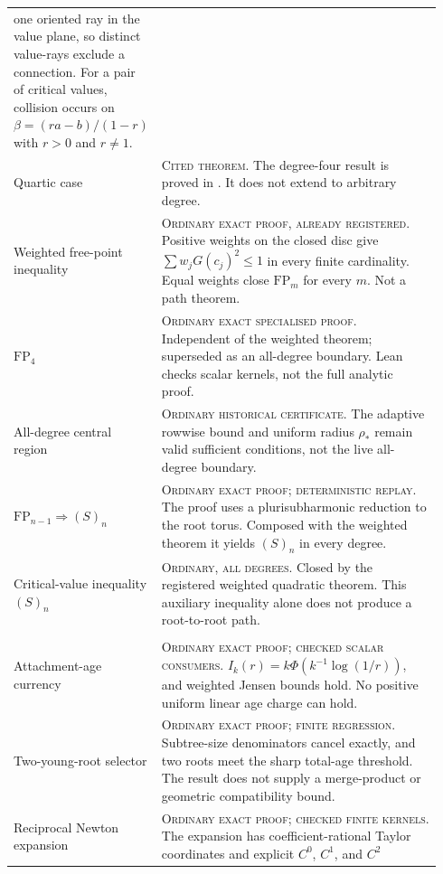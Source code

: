 {\begin{longtable}{@{}
  >{\raggedright\arraybackslash}p{0.28\linewidth}
  >{\raggedright\arraybackslash}p{0.66\linewidth}@{}}
one oriented ray in the value plane, so distinct value-rays exclude a connection.  For a pair of
critical values, collision occurs on
$\beta=(ra-b)/(1-r)$ with $r>0$ and $r\ne1$. \\
\addlinespace
Quartic case &
\textsc{Cited theorem.}  The degree-four result is proved in
\cite[Thm.~1, p.~1]{june2026}.  It does not extend to arbitrary degree. \\
\addlinespace
Weighted free-point inequality &
\textsc{Ordinary exact proof, already registered.}  Positive weights on the
closed disc give $\sum w_j G(c_j)^2\le 1$ in every finite cardinality.
Equal weights close $\mathrm{FP}_m$ for every $m$.  Not a path theorem. \\
\addlinespace
$\mathrm{FP}_4$ &
\textsc{Ordinary exact specialised proof.}  Independent of the weighted
theorem; superseded as an all-degree boundary.  Lean checks scalar kernels,
not the full analytic proof. \\
\addlinespace
All-degree central region &
\textsc{Ordinary historical certificate.}  The adaptive rowwise bound and
uniform radius $\rho_*$ remain valid sufficient conditions, not the live
all-degree boundary. \\
\addlinespace
$\mathrm{FP}_{n-1}\Rightarrow(S)_n$ &
\textsc{Ordinary exact proof; deterministic replay.}  The proof uses a
plurisubharmonic reduction to the root torus.  Composed with the weighted
theorem it yields $(S)_n$ in every degree. \\
\addlinespace
Critical-value inequality $(S)_n$ &
\textsc{Ordinary, all degrees.}  Closed by the registered weighted quadratic
theorem.  This auxiliary inequality alone does not produce a root-to-root
path. \\
\midrule
\multicolumn{2}{@{}p{0.94\linewidth}@{}}{\textbf{Attachment-time and local-transfer route}} \\
\addlinespace
Attachment-age currency &
\textsc{Ordinary exact proof; checked scalar consumers.}
$I_k(r)=k\Phi(k^{-1}\log(1/r))$, and weighted Jensen bounds hold.  No
positive uniform linear age charge can hold. \\
\addlinespace
Two-young-root selector &
\textsc{Ordinary exact proof; finite regression.}  Subtree-size denominators
cancel exactly, and two roots meet the sharp total-age threshold.  The result
does not supply a merge-product or geometric compatibility bound. \\
\addlinespace
Reciprocal Newton expansion &
\textsc{Ordinary exact proof; checked finite kernels.}  The expansion has
coefficient-rational Taylor coordinates and explicit $C^0$, $C^1$, and $C^2$

\end{longtable}}
